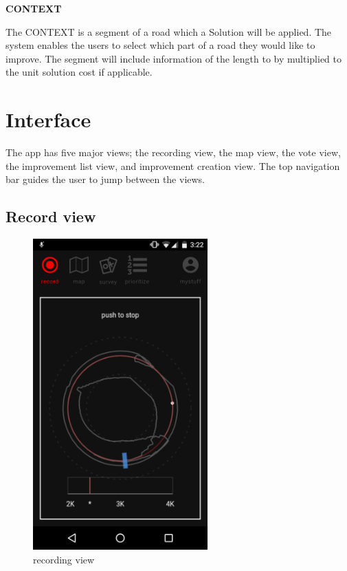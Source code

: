 \textbf{CONTEXT}

The CONTEXT is a segment of a road which a Solution will be applied. The
system enables the users to select which part of a road they would like to
improve. The segment will include information of the length to by
multiplied to the unit solution cost if applicable.

%
\section{Interface}

The app has five major views; the recording view, the map view, the
vote view, the improvement list view, and improvement creation view. The
top navigation bar guides the user to jump between the views.

\subsection{Record view}

\begin{figure}[!htb]
  \includegraphics[width=0.6\textwidth]{chapters/4/fig/interface_recording.png}
  \caption[interface: Record]{recording view}
  \label{fig:interface_record}
\end{figure}

